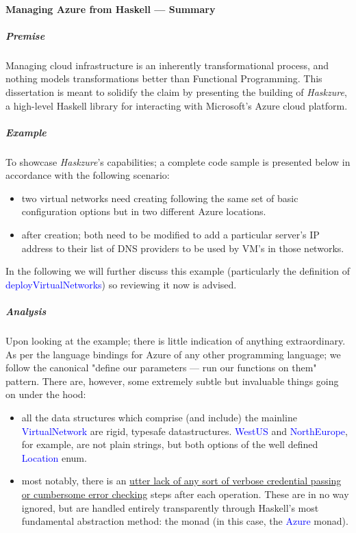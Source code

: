 \documentclass[11pt]{article}
\begin{document}
\paragraph{Managing Azure from Haskell --- Summary}

\subparagraph{Premise}

Managing cloud infrastructure is an inherently transformational process,
and nothing models transformations better than Functional Programming.
This dissertation is meant to solidify the claim by presenting the building of
\textit{Haskzure}, a high-level Haskell library for interacting with
Microsoft's Azure cloud platform.

\subparagraph{Example}

To showcase \textit{Haskzure}'s capabilities; a complete code sample is
presented below in accordance with the following scenario:

\begin{itemize}
    \item{}
        two virtual networks need creating following the same set of
        basic configuration options but in two different Azure locations.
    \item{}
        after creation; both need to be modified to add a particular server's
        IP address to their list of DNS providers to be used by VM's in those
        networks.
\end{itemize}

In the following we will further discuss this example (particularly the
definition of \textcolor{blue}{deployVirtualNetworks}) so reviewing it
now is advised.

\subparagraph{Analysis}

Upon looking at the example; there is little indication of anything
extraordinary. As per the language bindings for Azure of any other programming
language; we follow the canonical "define our parameters --- run our functions
on them" pattern. There are, however, some extremely subtle but invaluable
things going on under the hood:

\begin{itemize}

    \item{} all the data structures which comprise (and include) the mainline
        \textcolor{blue}{VirtualNetwork} are rigid, typesafe datastructures.
        \textcolor{blue}{WestUS} and \textcolor{blue}{NorthEurope}, for example,
        are not plain strings, but both options of the well defined
        \textcolor{blue}{Location} enum.

    \item{} most notably, there is an \ul{utter lack of any sort of
        verbose credential passing or cumbersome error checking} steps after
        each operation. These are in no way ignored, but are handled entirely
        transparently through Haskell's most fundamental abstraction method:
        the monad (in this case, the \textcolor{blue}{Azure} monad).

\end{itemize}
\end{document}
